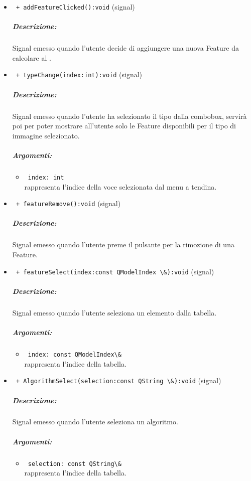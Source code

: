 \begin{itemize}
\item \color{blue}\verb! + addFeatureClicked():void! (signal)
\color{black} 
\subparagraph{Descrizione:}
Signal\g{} emesso quando l'utente decide di aggiungere una nuova Feature\g{} da calcolare al \protocol{}.

\item\color{blue}\verb! + typeChange(index:int):void! (signal)
\color{black} 
\subparagraph{Descrizione:}
Signal\g{} emesso quando l'utente ha selezionato il tipo dalla combobox, servirà poi per poter mostrare all'utente solo le Feature\g{} disponibili per il tipo di immagine selezionato.
\subparagraph{Argomenti:}
\begin{itemize}
\item \color{RoyalPurple}\verb! index: int! \\rappresenta l'indice della voce selezionata dal menu a tendina.
\end{itemize}

\item \color{blue}\verb! + featureRemove():void! (signal)
\color{black} 
\subparagraph{Descrizione:}
Signal\g{} emesso quando l'utente preme il pulsante per la rimozione di una Feature\g{}.

\item\color{blue}\verb! + featureSelect(index:const QModelIndex \&):void! (signal)
\color{black} 
\subparagraph{Descrizione:}
Signal\g{} emesso quando l'utente seleziona un elemento dalla tabella.
\subparagraph{Argomenti:}
\begin{itemize}
\item \color{RoyalPurple}\verb! index: const QModelIndex\& ! \\rappresenta l'indice della tabella.
\end{itemize}

\item\color{blue}\verb! + AlgorithmSelect(selection:const QString \&):void! (signal)
\color{black} 
\subparagraph{Descrizione:}
Signal\g{} emesso quando l'utente seleziona un algoritmo.
\subparagraph{Argomenti:}
\begin{itemize}
\item \color{RoyalPurple}\verb! selection: const QString\&  ! \\rappresenta l'indice della tabella.
\end{itemize}

\end{itemize}
\color{black}
\pagebreak
